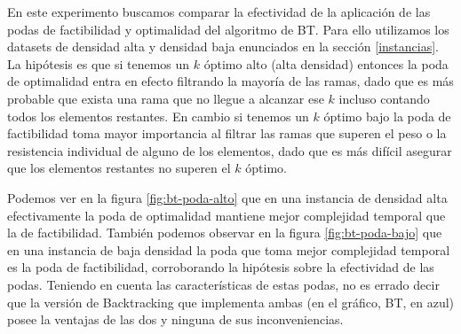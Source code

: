\documentclass[10pt,a4paper]{article}
\begin{document}
En este experimento buscamos comparar la efectividad de la aplicación de las podas de factibilidad y optimalidad del algoritmo de BT. Para ello utilizamos los datasets de densidad alta y densidad baja enunciados en la sección \ref{instancias}. La hipótesis es que si tenemos un $k$ óptimo alto (alta densidad) entonces la poda de optimalidad entra en efecto filtrando la mayoría de las ramas, dado que es más probable que exista una rama que no llegue a alcanzar ese $k$ incluso contando todos los elementos restantes. En cambio si tenemos un $k$ óptimo bajo la poda de factibilidad toma mayor importancia al filtrar las ramas que superen el peso o la resistencia individual de alguno de los elementos, dado que es más difícil asegurar que los elementos restantes no superen el $k$ óptimo.

Podemos ver en la figura \ref{fig:bt-poda-alto} que en una instancia de densidad alta efectivamente la poda de optimalidad mantiene mejor complejidad temporal que la de factibilidad. También podemos observar en la figura \ref{fig:bt-poda-bajo} que en una instancia de baja densidad la poda que toma mejor complejidad temporal es la poda de factibilidad, corroborando la hipótesis sobre la efectividad de las podas.
Teniendo en cuenta las características de estas podas, no es errado decir que la versión de Backtracking que implementa ambas (en el gráfico, BT, en azul) posee la ventajas de las dos y ninguna de sus inconveniencias.

\newpage
\end{document}
